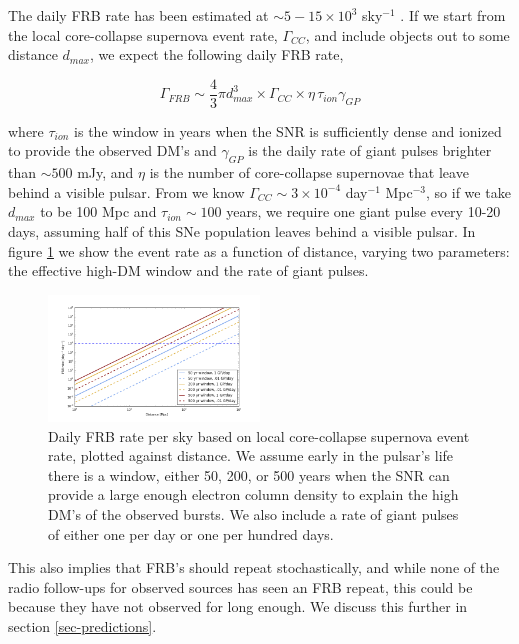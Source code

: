 \documentclass[useAMS,usenatbib]{emulateapj}
\begin{document}
The daily FRB rate has been estimated at $\sim5-15\times10^3$ sky$^{-1}$ 
\citep{2013Sci...341...53T}. If we start from the local core-collapse supernova
event rate, $\Gamma_{CC}$, and include objects out to some distance $d_{max}$,
we expect the following daily FRB rate, 

\begin{equation}
\Gamma_{FRB} \sim  \frac{4}{3} \pi d_{max}^3 \times \Gamma_{CC} \times
 \eta \, \tau_{ion} \gamma_{GP}
\end{equation}

\noindent where $\tau_{ion}$ is the window in years when the SNR is sufficiently
dense and ionized to provide the observed DM's and $\gamma_{GP}$
is the daily rate of giant pulses brighter than $\sim 500$ mJy, and $\eta$
is the number of core-collapse supernovae that leave behind a visible pulsar. 
From \citep{2004ApJ...615..253P} we know  
$\Gamma_{CC}\sim3 \times 10^{-4}$ day$^{-1}$ Mpc$^{-3}$,
so if we take $d_{max}$ to be 100 Mpc and $\tau_{ion}\sim100$ years,
we require one giant pulse every 10-20 days, assuming half of this SNe population
leaves behind a visible pulsar. 
In figure \ref{FIG-RATE} 
we show the event rate as a function of distance, varying two parameters: the 
effective high-DM window and the rate of giant pulses. 

\begin{figure}[h!]
  \centering
   \includegraphics[width=0.5\textwidth]{FRB_SNR_rate.png}
   \caption{Daily FRB rate per sky based on local core-collapse supernova 
   event rate, plotted against distance.
   We assume early in the pulsar's life there is a window, either 
   50, 200, or 500 years when the SNR can provide a large enough electron 
   column density to explain the high DM's of the observed bursts. We also
   include a rate of giant pulses of either one per day or one per hundred
   days.}
   \label{FIG-RATE}
\end{figure}

This also implies that FRB's
should repeat stochastically, and while none of the radio follow-ups for
observed sources has seen an FRB repeat, this could be because they
have not observed for long enough. We discuss this further in section 
\ref{sec-predictions}.
\end{document}
